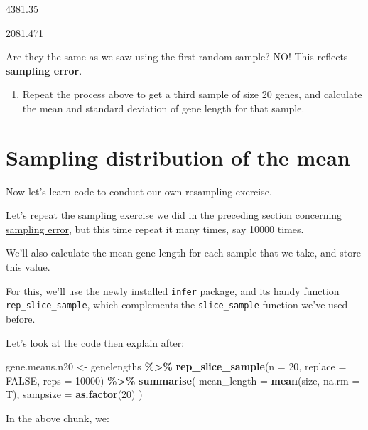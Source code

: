 \documentclass[
]{book}
\newenvironment{Shaded}{\begin{snugshade}}{\end{snugshade}}
\newcommand{\AttributeTok}[1]{\textcolor[rgb]{0.13,0.29,0.53}{#1}}
\newcommand{\ConstantTok}[1]{\textcolor[rgb]{0.56,0.35,0.01}{#1}}
\newcommand{\DecValTok}[1]{\textcolor[rgb]{0.00,0.00,0.81}{#1}}
\newcommand{\FunctionTok}[1]{\textcolor[rgb]{0.13,0.29,0.53}{\textbf{#1}}}
\newcommand{\NormalTok}[1]{#1}
\newcommand{\OtherTok}[1]{\textcolor[rgb]{0.56,0.35,0.01}{#1}}
\newcommand{\SpecialCharTok}[1]{\textcolor[rgb]{0.81,0.36,0.00}{\textbf{#1}}}
\providecommand{\tightlist}{%
  \setlength{\itemsep}{0pt}\setlength{\parskip}{0pt}}
\begin{document}
4381.35

2081.471

Are they the same as we saw using the first random sample? NO! This reflects \textbf{sampling error}.

\begin{enumerate}
\def\labelenumi{\arabic{enumi}.}
\tightlist
\item
  Repeat the process above to get a third sample of size 20 genes, and calculate the mean and standard deviation of gene length for that sample.
\end{enumerate}

\section{Sampling distribution of the mean}\label{sampdistmean}

Now let's learn code to conduct our own resampling exercise.

Let's repeat the sampling exercise we did in the preceding section concerning \hyperref[sampling_error]{sampling error}, but this time repeat it many times, say 10000 times.

We'll also calculate the mean gene length for each sample that we take, and store this value.

For this, we'll use the newly installed \texttt{infer} package, and its handy function \texttt{rep\_slice\_sample}, which complements the \texttt{slice\_sample} function we've used before.

Let's look at the code then explain after:

\begin{Shaded}
\begin{Highlighting}[]
\NormalTok{gene.means.n20 }\OtherTok{\textless{}{-}}\NormalTok{ genelengths }\SpecialCharTok{\%\textgreater{}\%}
  \FunctionTok{rep\_slice\_sample}\NormalTok{(}\AttributeTok{n =} \DecValTok{20}\NormalTok{, }\AttributeTok{replace =} \ConstantTok{FALSE}\NormalTok{, }\AttributeTok{reps =} \DecValTok{10000}\NormalTok{) }\SpecialCharTok{\%\textgreater{}\%}
  \FunctionTok{summarise}\NormalTok{(}
    \AttributeTok{mean\_length =} \FunctionTok{mean}\NormalTok{(size, }\AttributeTok{na.rm =}\NormalTok{ T),}
    \AttributeTok{sampsize =} \FunctionTok{as.factor}\NormalTok{(}\DecValTok{20}\NormalTok{)}
\NormalTok{  )}
\end{Highlighting}
\end{Shaded}

In the above chunk, we:
\end{document}
